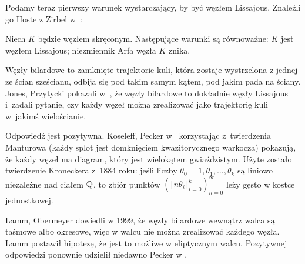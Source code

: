 Podamy teraz pierwszy warunek wystarczający, by być węzłem Lissajous.
Znaleźli go Hoste z Zirbel w~\cite{zirbel06}:
%
%

\begin{proposition}
%
%
    Niech $K$ będzie węzłem skręconym.
    Następujące warunki są równoważne: $K$ jest węzłem Lissajous; niezmiennik Arfa węzła $K$ znika.
\end{proposition}

Węzły bilardowe to zamknięte trajektorie kuli, która zostaje wystrzelona z jednej ze ścian sześcianu, odbija się pod takim samym kątem, pod jakim pada na ściany.
%
Jones, Przytycki pokazali w~\cite{jones98}, że węzły bilardowe to dokładnie węzły Lissajous i~zadali pytanie, czy każdy węzeł można zrealizować jako trajektorię kuli w~jakimś wielościanie.
%
%

Odpowiedź jest pozytywna.
Koseleff, Pecker w~\cite{koseleff14} korzystając z~twierdzenia Manturowa
%
(każdy splot jest domknięciem kwazitorycznego warkocza)
pokazują, że każdy węzeł ma diagram, który jest wielokątem gwiaździstym.
Użyte zostało twierdzenie Kroneckera z~1884 roku: jeśli liczby $\theta_0 = 1, \theta_1, \ldots, \theta_k$ są liniowo niezależne nad ciałem $\mathbb Q$, to zbiór punktów $(\lfloor n\theta_i \rfloor_{i=0}^k)_{n=0}^\infty$ leży gęsto w kostce jednostkowej.

Lamm, Obermeyer dowiedli w 1999, że węzły bilardowe wewnątrz walca są taśmowe albo okresowe, więc w walcu nie można zrealizować każdego węzła.
%
%
Lamm postawił hipotezę, że jest to możliwe w eliptycznym walcu.
Pozytywnej odpowiedzi ponownie udzielił niedawno Pecker w \cite{pecker12}.



